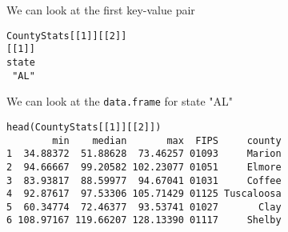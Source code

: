 We can look at the first key-value pair

\begin{verbatim}
CountyStats[[1]][[2]]
[[1]]
state
 "AL"
\end{verbatim}

We can look at the \texttt{data.frame} for state "AL"

\begin{verbatim}
head(CountyStats[[1]][[2]])
        min    median       max  FIPS     county
1  34.88372  51.88628  73.46257 01093     Marion
2  94.66667  99.20582 102.23077 01051     Elmore
3  83.93817  88.59977  94.67041 01031     Coffee
4  92.87617  97.53306 105.71429 01125 Tuscaloosa
5  60.34774  72.46377  93.53741 01027       Clay
6 108.97167 119.66207 128.13390 01117     Shelby
\end{verbatim}
